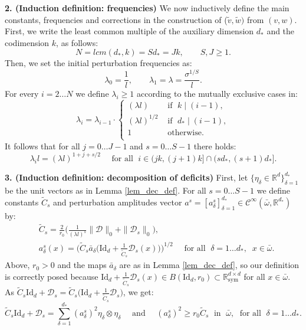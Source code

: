 \documentclass[reqno,twoside,11pt]{amsart}
\newcommand{\sym}{\mathrm{sym}}
\newcommand{\Id}{\mathrm{Id}}
\newcommand{\R}{\mathbb{R}}
\numberwithin{equation}{section}
\theoremstyle{plain}
\theoremstyle{definition}
\begin{document}
\medskip

{\bf 2. (Induction definition: frequencies)}  We now inductively define the main
constants, frequencies and corrections in the construction of ($\tilde
v,\tilde w)$ from $(v,w)$. First, we write the least common multiple
of the auxiliary dimension $d_*$ and the codimension $k$, as follows:
\begin{equation}\label{lcm_def}
N=lcm(d_*,k) = Sd_* = Jk, \qquad S,J\geq 1.
\end{equation}
Then, we set the initial perturbation frequencies as:
$$\lambda_0 = \frac{1}{l}, \qquad \lambda_1=\lambda = \frac{\sigma^{1/S}}{l}.$$
For every $i=2\ldots N$ we define $\lambda_i\geq 1$ according to the
mutually exclusive cases in:
\begin{equation*}
\lambda_i = \lambda_{i-1} \cdot\left\{\begin{array}{ll} (\lambda l) & \mbox{ if }\; k\mid (i-1), \\  
(\lambda l)^{1/2} & \mbox{ if }\; d_*\mid (i-1), \\  1 & \mbox{ otherwise. }\\  
\end{array}\right.
\end{equation*}
It follows that for all $j=0\ldots J-1$ and $s=0\ldots S-1$ there holds: 
\begin{equation}\label{count_lam}
\lambda_i l = (\lambda l)^{1+j+s/2 }\quad \mbox{ for all }\; i\in (jk, (j+1)k]\cap (sd_*, (s+1)d_*].
\end{equation}

\medskip

{\bf 3. (Induction definition: decomposition of deficits)}  First, let
$\{\eta_\delta\in\R^d\}_{\delta=1}^{d_*}$ be the unit vectors as in
Lemma \ref{lem_dec_def}. For all $s=0\ldots 
S-1$ we define constants $\tilde C_s$ and perturbation amplitudes vector
$a^s = [a_\delta^s]_{\delta=1}^{d_*}\in\mathcal{C}^\infty(\bar\omega,\R^{d_*})$ by:
\begin{equation*}
\begin{split}
& \tilde C_s = \frac{2}{r_0}\Big(\frac{1}{(\lambda l)^s} \|\mathcal{D}\|_0 + \|\mathcal{D}_s\|_0\Big),\\
& a_\delta^s(x) = \Big(\tilde C_s\bar a_\delta\big(\Id_d + \frac{1}{\tilde C_s}\mathcal{D}_s(x)\big)\Big)^{1/2}
\quad \mbox{ for all }\; \delta=1\ldots d_*, \;\; x\in\bar\omega.
\end{split}
\end{equation*}
Above, $r_0>0$ and the maps ${\bar a}_\delta$ are as in Lemma
\ref{lem_dec_def}, so our definition is correctly posed because
$\Id_d + \frac{1}{\tilde C_s}\mathcal{D}_s (x)\in
B(\Id_d,r_0)\subset\R^{d\times d}_\sym$ for all $x\in \bar\omega$. As
$\tilde C_s \Id_d + \mathcal{D}_s = \tilde C_s \big(\Id_d + 
\frac{1}{\tilde C_s}\mathcal{D}_s \big)$, we get: 
\begin{equation}\label{low_bd_as}
\tilde C_s \Id_d + \mathcal{D}_s = \sum_{\delta=1}^{d_*}
(a_\delta^s)^2\eta_\delta\otimes\eta_\delta \quad\mbox{ and }\quad (a_\delta^s)^2\geq
r_0\tilde C_s \;\mbox{ in } \;\bar\omega,\;\mbox{ for all } \;\delta=1\ldots d_*.
\end{equation}
\end{document}
